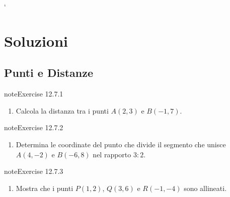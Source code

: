 \documentclass[letterpaper,10pt,italian]{jupyterBook}
\begin{document}
\sphinxAtStartPar
`

\sphinxstepscope


\section{Soluzioni}
\label{\detokenize{ch/analytic_geometry/analytic_geometry_2d/sol:soluzioni}}\label{\detokenize{ch/analytic_geometry/analytic_geometry_2d/sol:geometry-analytic-2d-sol}}\label{\detokenize{ch/analytic_geometry/analytic_geometry_2d/sol::doc}}

\subsection{Punti e Distanze}
\label{\detokenize{ch/analytic_geometry/analytic_geometry_2d/sol:punti-e-distanze}} \label{exercise:ch/analytic_geometry/analytic_geometry_2d/sol-exercise-0}

\begin{sphinxadmonition}{note}{Exercise 12.7.1}


\begin{enumerate}
%
\item {} 
\sphinxAtStartPar
Calcola la distanza tra i punti \( A(2, 3) \) e \( B(-1, 7) \).

\end{enumerate}
\end{sphinxadmonition}
 \label{exercise:ch/analytic_geometry/analytic_geometry_2d/sol-exercise-1}

\begin{sphinxadmonition}{note}{Exercise 12.7.2}


\begin{enumerate}
%
\setcounter{enumi}{1}
\item {} 
\sphinxAtStartPar
Determina le coordinate del punto che divide il segmento che unisce \( A(4, -2) \) e \( B(-6, 8) \) nel rapporto \( 3:2 \).

\end{enumerate}
\end{sphinxadmonition}
 \label{exercise:ch/analytic_geometry/analytic_geometry_2d/sol-exercise-2}

\begin{sphinxadmonition}{note}{Exercise 12.7.3}


\begin{enumerate}
%
\setcounter{enumi}{2}
\item {} 
\sphinxAtStartPar
Mostra che i punti \( P(1, 2) \), \( Q(3, 6) \) e \( R(-1, -4) \) sono allineati.

\end{enumerate}
\end{sphinxadmonition}
 \label{exercise:ch/analytic_geometry/analytic_geometry_2d/sol-exercise-3}
\end{document}
